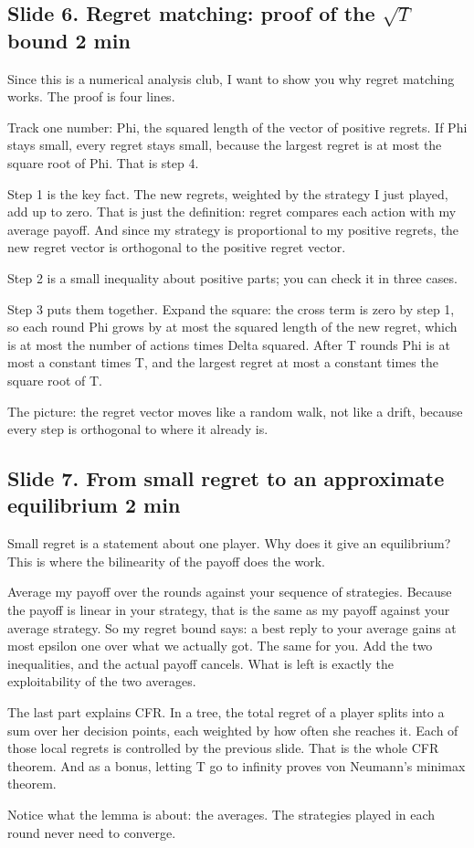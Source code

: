 \documentclass[11pt]{article}
\newcommand{\slidehead}[3]{\subsection*{Slide #1. #2 \hfill {\normalfont\small #3}}}
\begin{document}
\slidehead{6}{Regret matching: proof of the $\sqrt T$ bound}{2 min}
\begin{say}
Since this is a numerical analysis club, I want to show you why regret matching works. The proof is four lines.

Track one number: Phi, the squared length of the vector of positive regrets. If Phi stays small, every regret stays
small, because the largest regret is at most the square root of Phi. That is step 4.

Step 1 is the key fact. The new regrets, weighted by the strategy I just played, add up to zero. That is just the
definition: regret compares each action with my average payoff. And since my strategy is proportional to my positive
regrets, the new regret vector is orthogonal to the positive regret vector.

Step 2 is a small inequality about positive parts; you can check it in three cases.

Step 3 puts them together. Expand the square: the cross term is zero by step 1, so each round Phi grows by at most
the squared length of the new regret, which is at most the number of actions times Delta squared. After T rounds Phi
is at most a constant times T, and the largest regret at most a constant times the square root of T.

The picture: the regret vector moves like a random walk, not like a drift, because every step is orthogonal to where
it already is.
\end{say}

\slidehead{7}{From small regret to an approximate equilibrium}{2 min}
\begin{say}
Small regret is a statement about one player. Why does it give an equilibrium? This is where the bilinearity of the
payoff does the work.

Average my payoff over the rounds against your sequence of strategies. Because the payoff is linear in your
strategy, that is the same as my payoff against your average strategy. So my regret bound says: a best reply to
your average gains at most epsilon one over what we actually got. The same for you. Add the two inequalities, and
the actual payoff cancels. What is left is exactly the exploitability of the two averages.

The last part explains CFR. In a tree, the total regret of a player splits into a sum over her decision points,
each weighted by how often she reaches it. Each of those local regrets is controlled by the previous slide. That is
the whole CFR theorem. And as a bonus, letting T go to infinity proves von Neumann's minimax theorem.

Notice what the lemma is about: the averages. The strategies played in each round never need to converge.
\end{say}
\end{document}
